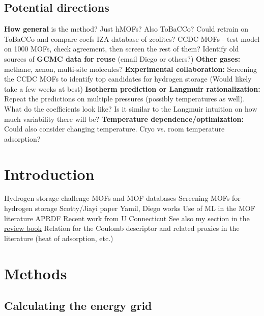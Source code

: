 \documentclass[letterpaper]{article}
\begin{document}
\subsection{Potential directions}
\begin{outline}
	\1 \textbf{How general} is the method?  Just hMOFs?  Also ToBaCCo?
		\2 Could retrain on ToBaCCo and compare coefs
		\2 IZA database of zeolites?
		\2 CCDC MOFs - test model on 1000 MOFs, check agreement, then screen the rest of them?
	\1 Identify old sources of \textbf{GCMC data for reuse} (email Diego or others?)
	\1 \textbf{Other gases:} methane, xenon, multi-site molecules?
	\1 \textbf{Experimental collaboration:} Screening the CCDC MOFs to identify top candidates for hydrogen storage (Would likely take a few weeks at best)
	\1 \textbf{Isotherm prediction or Langmuir rationalization:} Repeat the predictions on multiple pressures (possibly temperatures as well).  What do the coefficients look like?  Is it similar to the Langmuir intuition on how much variability there will be?
	\1 \textbf{Temperature dependence/optimization:} Could also consider changing temperature.  Cryo vs. room temperature adsorption?
\end{outline}


\section{Introduction}

\begin{outline}
	\1 Hydrogen storage challenge
	\1 MOFs and MOF databases
	\1 Screening MOFs for hydrogen storage
		\2 Scotty/Jiayi paper
		\2 Yamil, Diego works
	\1 Use of ML in the MOF literature
		\2 APRDF
		\2 Recent work from U Connecticut
		\2 See also my section in the \href{https://www.elsevier.com/books/modelling-and-simulation-in-the-science-of-micro-and-meso-porous-materials/catlow/978-0-12-805057-6}{review book}
		\2 Relation for the Coulomb descriptor and related proxies in the literature (heat of adsorption, etc.)
\end{outline}



\section{Methods}

\subsection{Calculating the energy grid}
\end{document}
